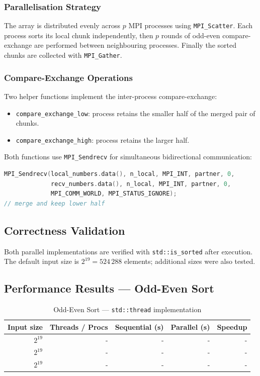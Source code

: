 \documentclass[11pt,a4paper]{article}
\begin{document}
\subsubsection{Parallelisation Strategy}

The array is distributed evenly across $p$ MPI processes using \texttt{MPI\_Scatter}. Each
process sorts its local chunk independently, then $p$ rounds of odd-even compare-exchange are
performed between neighbouring processes. Finally the sorted chunks are collected with
\texttt{MPI\_Gather}.

\subsubsection{Compare-Exchange Operations}

Two helper functions implement the inter-process compare-exchange:
\begin{itemize}
    \item \texttt{compare\_exchange\_low}: process retains the smaller half of the merged pair
          of chunks.
    \item \texttt{compare\_exchange\_high}: process retains the larger half.
\end{itemize}

Both functions use \texttt{MPI\_Sendrecv} for simultaneous bidirectional communication:

\begin{lstlisting}[language=C++, caption=MPI compare-exchange (low variant)]
MPI_Sendrecv(local_numbers.data(), n_local, MPI_INT, partner, 0,
             recv_numbers.data(), n_local, MPI_INT, partner, 0,
             MPI_COMM_WORLD, MPI_STATUS_IGNORE);
// merge and keep lower half
\end{lstlisting}

\subsection{Correctness Validation}

Both parallel implementations are verified with \texttt{std::is\_sorted} after execution.
The default input size is $2^{19} = 524\,288$ elements; additional sizes were also tested.

\subsection{Performance Results --- Odd-Even Sort}

\begin{table}[h]
\centering
\begin{tabular}{|r|r|r|r|r|}
\hline
\textbf{Input size} & \textbf{Threads / Procs} & \textbf{Sequential (s)} & \textbf{Parallel (s)} & \textbf{Speedup} \\
\hline
$2^{19}$ & - & - & - & - \\
$2^{19}$ & - & - & - & - \\
$2^{19}$ & - & - & - & - \\
\hline
\end{tabular}
\caption{Odd-Even Sort --- \texttt{std::thread} implementation}
\end{table}
\end{document}
